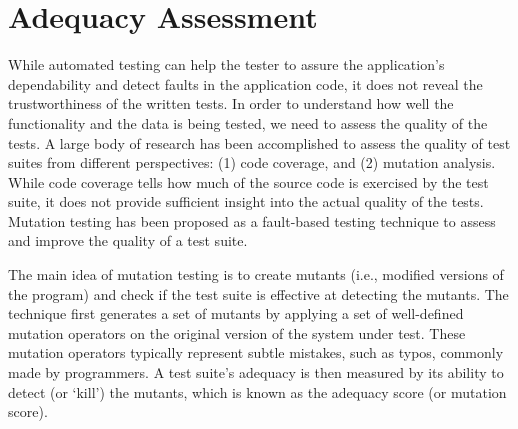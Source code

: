 \section{Adequacy Assessment} \label{Sec:adequacy}
While automated testing can help the tester to assure the application's dependability and detect faults in the application code, it does not reveal the trustworthiness of the written tests.
In order to understand how well the functionality and the data is being tested, we need to assess the quality of the tests.
A large body of research has been accomplished to assess the quality of test suites
from different perspectives: (1) code coverage, and (2) mutation analysis.
While code coverage tells how much of the source code is exercised by the test suite, it does not provide sufficient insight into the actual quality of the tests. Mutation testing has been proposed as a fault-based testing technique to assess and improve the quality of a test suite.

The main idea of mutation testing is to create mutants (i.e., modified versions of the program) and check if the test suite is effective at detecting the mutants. 
The technique first generates a set of mutants by applying a set of well-defined mutation operators on the original version of the system under test. 
These mutation operators typically represent subtle mistakes, such as typos, commonly made by programmers. A test suite's adequacy is then measured by its ability to detect (or `kill') the mutants, which is known as the adequacy score (or mutation score).

